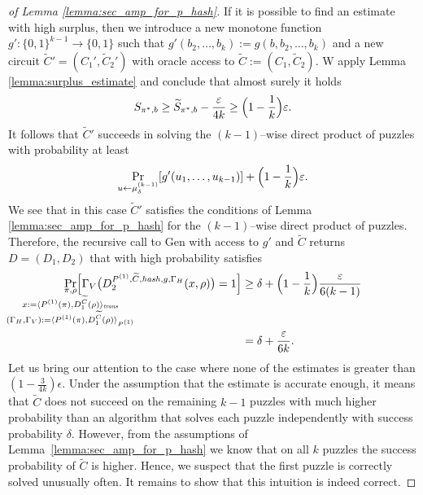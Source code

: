 \begin{proof}[of Lemma \ref{lemma:sec_amp_for_p_hash}]
If it is possible to find an estimate with high surplus, then we introduce a new monotone function $g': \{0,1\}^{k-1} \rightarrow \{0,1\}$
such that $g'(b_2, \dots, b_k) := g(b, b_2, \dots, b_k)$ and a new circuit $\widetilde{C}' = (C_1', \widetilde{C}_2')$
with oracle access to $\widetilde{C} := (C_1, \widetilde{C}_2)$.
W apply Lemma \ref{lemma:surplus_estimate} and conclude that almost surely it holds
\begin{align*}
S_{\pi^*,b} \geq \widetilde{S}_{\pi^*, b} - \frac{\epsilon}{4k} \geq \Bigl(1 - \frac{1}{k}\Bigr)\epsilon.
\end{align*}
It follows that $\widetilde{C}'$ succeeds in solving the $(k\!-\!1)$--wise direct product of puzzles with probability at least
\begin{align*}
\Pr_{u \leftarrow \mu^{(k-1)}_{\delta}}[g'(u_1,\dots, u_{k-1} )] + \Bigl(1 - \frac{1}{k}\Bigr)\epsilon.
\end{align*}
We see that in this case $\widetilde{C}'$ satisfies the conditions of Lemma \ref{lemma:sec_amp_for_p_hash} for the $(k\!-\!1)$--wise direct product of puzzles.
Therefore, the recursive call to Gen with access to $g'$ and $\widetilde{C}$ returns $D = (D_1, D_2)$ that with high probability satisfies
\begin{align}
  \underset{
    \mathclap{
      \substack{
        \pi, \rho \\
        x := \langle P^{(1)}(\pi), D_1^{\widetilde{C}}(\rho) \rangle_{\mathit{trans}} \\
        (\Gamma_H, \Gamma_V) := \langle P^{(1)}(\pi), D_1^{\widetilde{C}}(\rho) \rangle_{P^{(1)}}}}}
  {\Pr}\Big[\Gamma_V\big(D_2^{P^{(1)}, \widetilde{C}, \hash, g, \Gamma_H}(x, \rho)\big) = 1\Big]
  &\geq \delta + \Bigl(1 - \frac{1}{k}\Bigr)\frac{\epsilon}{6(k-1)} \notag\\
  &= \delta + \frac{\epsilon}{6k}.
\end{align}
%
Let us bring our attention to the case where none of the estimates is greater than $(1-\frac{3}{4k})\epsilon$.
Under the assumption that the estimate is accurate enough, it means that $\widetilde{C}$ does not succeed on the remaining $k-1$
puzzles with much higher probability than an algorithm that solves each puzzle independently with success probability $\delta$.
However, from the assumptions of Lemma~\ref{lemma:sec_amp_for_p_hash} we know that on all $k$ puzzles the success probability
of $\widetilde{C}$ is higher. Hence, we suspect that the first puzzle is correctly solved unusually often.
It remains to show that this intuition is indeed correct.


\end{proof}
